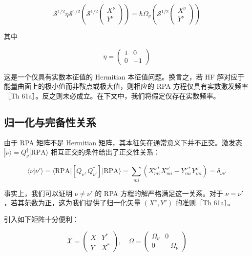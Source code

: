 \begin{equation}
\mathcal{S}^{1/2}\eta\mathcal{S}^{1/2}\left(\mathcal{S}^{1/2}\begin{pmatrix}X^{\nu}\\
Y^{\nu}
\end{pmatrix}\right)=\hbar\Omega_{\nu}\left(\mathcal{S}^{1/2}\begin{pmatrix}X^{\nu}\\
Y^{\nu}
\end{pmatrix}\right)\label{eq:rpa_s_half_hermitian}
\end{equation}

其中

\begin{equation}
\eta=\begin{pmatrix}1 & 0\\
0 & -1
\end{pmatrix}\label{eq:rpa_eta_metric_def}
\end{equation}

这是一个仅具有实数本征值的 Hermitian 本征值问题。换言之，若 HF 解对应于能量曲面上的极小值而非鞍点或极大值，则相应的
RPA 方程仅具有实数激发频率［Th 61a］。反之则未必成立。在下文中，我们将假定仅存在实数频率。

\subsection{归一化与完备性关系\label{subsec:8.4.3_=005F52=004E00=005316=004E0E=005B8C=005907=006027=005173=007CFB}}

由于 RPA 矩阵不是 Hermitian 矩阵，其本征矢在通常意义下并不正交。激发态 $|\nu\rangle=Q^{\dagger}_{\nu}|\text{RPA}\rangle$
相互正交的条件给出了正交性关系：

\begin{equation}
\langle\nu|\nu'\rangle=\langle\text{RPA}|[Q_{\nu},Q^{\dagger}_{\nu'}]|\text{RPA}\rangle=\sum_{mi}\left(X^{\nu*}_{mi}X^{\nu'}_{mi}-Y^{\nu*}_{mi}Y^{\nu'}_{mi}\right)=\delta_{\nu\nu'}\label{eq:rpa_orthonormality_condition}
\end{equation}

事实上，我们可以证明 $\nu\ne\nu'$ 的 RPA 方程的解严格满足这一关系。对于 $\nu=\nu'$，若其范数为正，这为我们提供了归一化矢量
$(X^{\nu},Y^{\nu})$ 的准则［Th 61a］。

引入如下矩阵十分便利：

\begin{equation}
\mathcal{X}=\begin{pmatrix}X & Y^{*}\\
Y & X^{*}
\end{pmatrix},\quad\Omega=\begin{pmatrix}\Omega_{\nu} & 0\\
0 & -\Omega_{\nu}
\end{pmatrix}\label{eq:rpa_big_x_matrix_def}
\end{equation}

